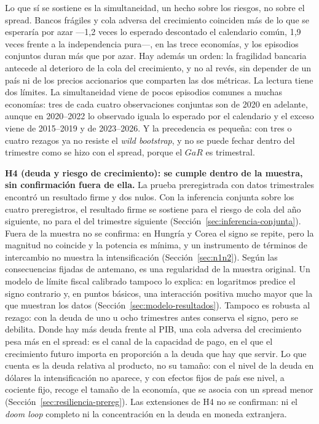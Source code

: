 Lo que sí se sostiene es la simultaneidad, un hecho sobre los riesgos, no sobre el spread. Bancos frágiles y cola adversa del crecimiento coinciden más de lo que se esperaría por azar ---1,2 veces lo esperado descontado el calendario común, 1,9 veces frente a la independencia pura---, en las trece economías, y los episodios conjuntos duran más que por azar. Hay además un orden: la fragilidad bancaria antecede al deterioro de la cola del crecimiento, y no al revés, sin depender de un país ni de los precios accionarios que comparten las dos métricas. La lectura tiene dos límites. La simultaneidad viene de pocos episodios comunes a muchas economías: tres de cada cuatro observaciones conjuntas son de 2020 en adelante, aunque en 2020--2022 lo observado iguala lo esperado por el calendario y el exceso viene de 2015--2019 y de 2023--2026. Y la precedencia es pequeña: con tres o cuatro rezagos ya no resiste el \textit{wild bootstrap}, y no se puede fechar dentro del trimestre como se hizo con el spread, porque el $GaR$ es trimestral.

\textbf{H4 (deuda y riesgo de crecimiento): se cumple dentro de la muestra, sin confirmación fuera de ella.} La prueba preregistrada con datos trimestrales encontró un resultado firme y dos nulos. Con la inferencia conjunta sobre los cuatro preregistros, el resultado firme se sostiene para el riesgo de cola del año siguiente, no para el del trimestre siguiente (Sección~\ref{sec:inferencia-conjunta}). Fuera de la muestra no se confirma: en Hungría y Corea el signo se repite, pero la magnitud no coincide y la potencia es mínima, y un instrumento de términos de intercambio no muestra la intensificación (Sección~\ref{sec:n1n2}). Según las consecuencias fijadas de antemano, es una regularidad de la muestra original. Un modelo de límite fiscal calibrado tampoco lo explica: en logaritmos predice el signo contrario y, en puntos básicos, una interacción positiva mucho mayor que la que muestran los datos (Sección~\ref{sec:modelo-resultados}). Tampoco es robusta al rezago: con la deuda de uno u ocho trimestres antes conserva el signo, pero se debilita. Donde hay más deuda frente al PIB, una cola adversa del crecimiento pesa más en el spread: es el canal de la capacidad de pago, en el que el crecimiento futuro importa en proporción a la deuda que hay que servir. Lo que cuenta es la deuda relativa al producto, no su tamaño: con el nivel de la deuda en dólares la intensificación no aparece, y con efectos fijos de país ese nivel, a cociente fijo, recoge el tamaño de la economía, que se asocia con un spread menor (Sección~\ref{sec:resiliencia-prereg}). Las extensiones de H4 no se confirman: ni el \textit{doom loop} completo ni la concentración en la deuda en moneda extranjera.

